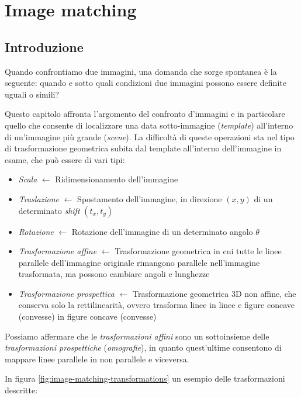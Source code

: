 \chapter{Image matching}
\label{chap:image-matching}


\section{Introduzione}
Quando confrontiamo due immagini, una domanda che sorge spontanea \`e la seguente: quando e sotto quali condizioni due immagini possono essere definite uguali o simili?\par
Questo capitolo affronta l'argomento del confronto d'immagini e in particolare quello che consente di localizzare una data sotto-immagine (\textit{template}) all'interno di un'immagine pi\`u grande (\textit{scene}). La difficolt\`a di queste operazioni sta nel tipo di trasformazione geometrica subita dal template all'interno dell'immagine in esame, che pu\`o essere di vari tipi:
\begin{itemize}
	\item \textit{Scala} $\gets$ Ridimensionamento dell'immagine
	\item \textit{Traslazione} $\gets$ Spostamento dell'immagine, in direzione $(x, y)$ di un determinato \textit{shift} $(t_{x}, t_{y})$
	\item \textit{Rotazione} $\gets$ Rotazione dell'immagine di un determinato angolo $\theta$
	\item \textit{Trasformazione affine} $\gets$ Trasformazione geometrica in cui tutte le linee parallele dell'immagine originale rimangono parallele nell'immagine trasformata, ma possono cambiare angoli e lunghezze
	\item \textit{Trasformazione prospettica} $\gets$ Trasformazione geometrica 3D non affine, che conserva solo la rettilinearit\`a, ovvero trasforma linee in linee e figure concave (convesse) in figure concave (convesse)
\end{itemize}
Possiamo affermare che le \textit{trasformazioni affini} sono un sottoinsieme delle \textit{trasformazioni prospettiche} (\textit{omografie}), in quanto quest'ultime consentono di mappare linee parallele in non parallele e viceversa.\par
In figura \ref{fig:image-matching-transformations} un esempio delle trasformazioni descritte:
\pgfplotsset{compat=1.9}
